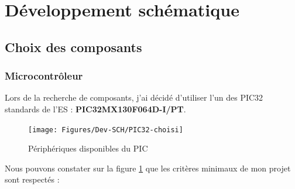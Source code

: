 \section{Développement schématique}

\subsection{Choix des composants} \label{ssec:num32}
{
	\subsubsection{Microcontrôleur}
	Lors de la recherche de composants, j'ai décidé d'utiliser l'un des PIC32 standards de l'ES :
	\textbf{PIC32MX130F064D-I/PT}.
		
	\begin{figure}[h]
		\centering
		\texttt{[image: Figures/Dev-SCH/PIC32-choisi]}
		\caption{Périphériques disponibles du PIC}
		\label{fig:pic32-choisi}
	\end{figure}
	
	Nous pouvons constater sur la figure \ref{fig:pic32-choisi} que les critères minimaux de mon projet sont respectés :
	
	\begin{center}
		   
	\end{center}
}

\clearpage
